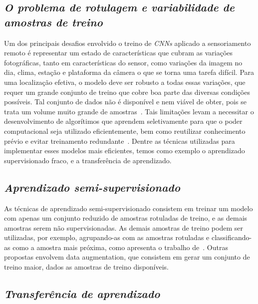 \subsection{\textit{O problema de rotulagem e variabilidade de amostras de treino}}\label{sec:Cap2_rotulagem}


Um dos principais desafios envolvido o treino de \textit{CNNs} aplicado a sensoriamento remoto é representar um estado de características que cubram as variações fotográficas, tanto em características do sensor, como variações da imagem no dia, clima, estação e plataforma da câmera o que se torna uma tarefa difícil. Para uma localização efetiva, o modelo deve ser robusto a todas essas variações, que requer um grande conjunto de treino que cobre boa parte das diversas condições possíveis. Tal conjunto de dados não é disponível e nem viável de obter, pois se trata um volume muito grande de amostras~\cite{rs13194017}. Tais limitações levam a necessitar o desenvolvimento de algorítimos que aprendem seletivamente para que o poder computacional seja utilizado eficientemente, bem como reutilizar conhecimento prévio e evitar treinamento redundante~\cite{rostami2019learning}.  Dentre as técnicas utilizadas para implementar esses modelos mais eficientes, temos como exemplo o aprendizado supervisionado fraco, e a transferência de aprendizado.

\subsection{\textit{Aprendizado semi-supervisionado}}\label{sec:Cap2_semisup}

As técnicas de aprendizado semi-supervisionado consistem em treinar um modelo com apenas um conjunto reduzido de amostras rotuladas de treino, e as demais amostras serem não supervisionadas. As demais amostras de treino podem ser utilizadas, por exemplo, agrupando-as com as amostras rotuladas e classificando-as como a amostra mais próxima, como apresenta o trabalho de~\cite{Sanches2003}. Outras propostas envolvem data augmentation, que consistem em gerar um conjunto de treino maior, dados as amostras de treino disponíveis.

\subsection{\textit{Transferência de aprendizado}}\label{sec:Cap2_transfer}

